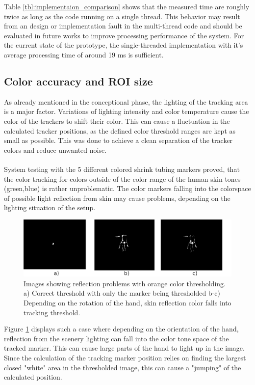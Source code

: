 Table \ref{tbl:implementaion_comparison} shows that the measured time are roughly twice as long as the code running on a single thread. This behavior may result from an design or implementation fault in the multi-thread code and should be evaluated in future works to improve processing performance of the system. For the current state of the prototype, the single-threaded implementation with it's average processing time of around 19 ms is sufficient.
\newpage
\subsection{Color accuracy and ROI size}
As already mentioned in the conceptional phase, the lighting of the tracking area is a major factor. Variations of lighting intensity and color temperature cause the color of the trackers to shift their color. This can cause a fluctuation in the calculated tracker positions, as the defined color threshold ranges are kept as small as possible. This was done to achieve a clean separation of the tracker colors and reduce unwanted noise. \\\\
System testing with the 5 different colored shrink tubing markers proved, that the color tracking for colors outside of the color range of the human skin tones (green,blue) is rather unproblematic. The color markers falling into the colorspace of possible light reflection from skin may cause problems, depending on the lighting situation of the setup.
\begin{figure}[H]
\includegraphics[width=\textwidth]{images/color_tracking_probs.png}
\caption{Images showing reflection problems with  orange color thresholding. a) Correct threshold with only the marker being thresholded b-c) Depending on the rotation of the hand, skin reflection color falls into tracking threshold.}
\label{img:Color_reflecton_problems} 
\end{figure}
Figure \ref{img:Color_reflecton_problems} displays such a case where depending on the orientation of the hand, reflection from the scenery lighting can fall into the color tone space of the tracked marker. This can cause large parts of the hand to light up in the image. Since the calculation of the tracking marker position relies on finding the largest closed "white" area in the thresholded image, this can cause a "jumping" of the calculated position. 
